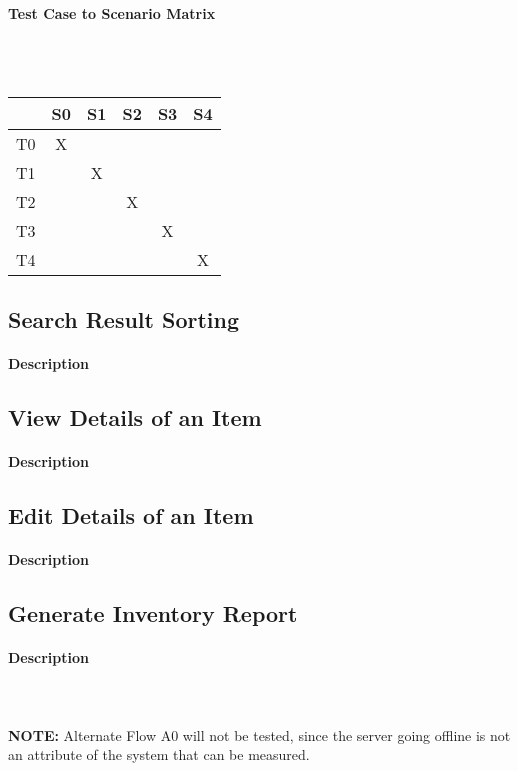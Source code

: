 \documentclass{article}
\begin{document}
\paragraph{Test Case to Scenario Matrix}~\\ \\
\begin{tabular}{ | c || c | c | c | c | c | }
\hline
    & S0 & S1 & S2 & S3 & S4 \\
\hline
\hline
T0 & X  &    &    &    &    \\
\hline
T1 &    & X  &    &    &    \\
\hline
T2 &    &    & X  &    &    \\
\hline
T3 &    &    &    & X  &    \\
\hline
T4 &    &    &    &    & X  \\
\hline
\end{tabular}

\subsection{Search Result Sorting}
\paragraph{Description}


\subsection{View Details of an Item}
\paragraph{Description}


\subsection{Edit Details of an Item}
\paragraph{Description}


\subsection{Generate Inventory Report}
\paragraph{Description}
~\\ \\
\textbf{NOTE:} Alternate Flow A0 will not be tested, since the server going offline is not an attribute of the system that can be measured.
\end{document}
